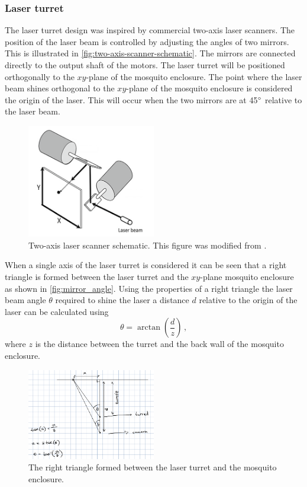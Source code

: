 \subsubsection{Laser turret}\label{subsubsec:laser_turret_design}
The laser turret design was inspired by commercial two-axis laser scanners. The position of the laser beam is controlled by adjusting the angles of two mirrors. This is illustrated in \autoref{fig:two-axis-scanner-schematic}. The mirrors are connected directly to the output shaft of the motors. The laser turret will be positioned orthogonally to the $xy$-plane of the mosquito enclosure. The point where the laser beam shines orthogonal to the $xy$-plane of the mosquito enclosure is considered the origin of the laser. This will occur when the two mirrors are at 45$^{\circ}$ relative to the laser beam.
\begin{figure}[h]
    \centering
    \includegraphics[width=0.5\textwidth]{figures/hardware_design/two_axis_scanner.png}
    \caption{Two-axis laser scanner schematic. This figure was modified from \cite{two-axis-scanner-schematic}.}
    \label{fig:two-axis-scanner-schematic}
\end{figure}

When a single axis of the laser turret is considered it can be seen that a right triangle is formed between the laser turret and the $xy$-plane mosquito enclosure as shown in \autoref{fig:mirror_angle}. Using the properties of a right triangle the laser beam angle $\theta$ required to shine the laser a distance $d$ relative to the origin of the laser can be calculated using
\begin{equation}
    \theta = \arctan{\left(\frac{d}{z}\right)}\,,
    \label{eq:mirror_angle}
\end{equation}
where $z$ is the distance between the turret and the back wall of the mosquito enclosure.
\begin{figure}[h]
    \centering
    \includegraphics[width=0.5\textwidth]{figures/hardware_design/mirror_angle.png}
    \caption{The right triangle formed between the laser turret and the mosquito enclosure.}
    \label{fig:mirror_angle}
\end{figure}

